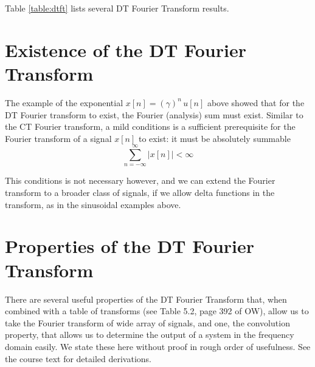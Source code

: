 \noindent Table \ref{table:dtft} lists several DT Fourier Transform results.

\section{Existence of the DT Fourier Transform}

The example of the exponential $x[n] = \left(\gamma\right)^n\,u[n]$ above showed that for the DT Fourier transform to exist, the Fourier (analysis) sum must exist. Similar to the CT Fourier transform, a mild conditions is a sufficient prerequisite for the Fourier transform of a signal $x[n]$ to exist: it must be  absolutely summable
\[
\sum\limits_{n = -\infty}^{\infty} |x[n]| < \infty
\]

This conditions is not necessary however, and we can extend the Fourier transform to a broader class of signals, if we allow delta functions in the transform, as in the sinusoidal examples above. 

\section{Properties of the DT Fourier Transform}

There are several useful properties of the DT Fourier Transform that, when combined with a table of transforms (see Table 5.2, page 392 of OW), allow us to take the Fourier transform of  wide array of signals, and one, the convolution property, that allows us to determine the output of a system in the frequency domain easily. We state these here without proof in rough order of usefulness. See the course text for detailed derivations.

